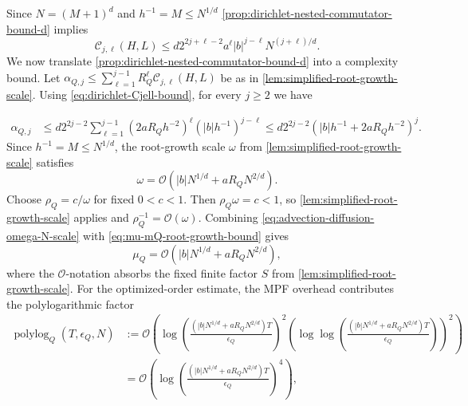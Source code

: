 \documentclass[10pt,reqno]{article}
\numberwithin{equation}{section}
\theoremstyle{plain}
\theoremstyle{definition}
\begin{document}
Since \(N=(M+1)^d\) and \(h^{-1}=M\leq N^{1/d}\) \cref{prop:dirichlet-nested-commutator-bound-d} implies
\begin{equation}\label{eq:dirichlet-Cjell-N-scaling}
\mathcal C_{j,\ell}(H,L) \leq d 2^{2j+\ell-2} a^\ell |b|^{j-\ell} N^{(j+\ell)/d}.
\end{equation}
We now translate \cref{prop:dirichlet-nested-commutator-bound-d} into a complexity bound.  Let \(\alpha_{Q,j} \leq \sum_{\ell=1}^{j-1} R_Q^\ell \mathcal C_{j,\ell}(H,L)\) be as in \cref{lem:simplified-root-growth-scale}. Using \cref{eq:dirichlet-Cjell-bound}, for every \(j \geq 2\) we have

\begin{align}\label{eq:advection-diffusion-alphaQj-bound}
\alpha_{Q,j} &\leq d2^{2j-2} \sum_{\ell=1}^{j-1} (2aR_Qh^{-2} )^\ell (|b|h^{-1} )^{j-\ell} \leq d2^{2j-2} ( |b|h^{-1} + 2aR_Qh^{-2} )^j .
\end{align}
Since \(h^{-1}=M\leq N^{1/d}\), the root-growth scale \(\omega\) from \cref{lem:simplified-root-growth-scale} satisfies
\begin{equation}\label{eq:advection-diffusion-omega-N-scale}
\omega = \mathcal O ( |b|N^{1/d} + aR_QN^{2/d}).
\end{equation}
Choose \(\rho_Q=c/\omega\) for fixed \(0<c<1\). Then \(\rho_Q\omega=c<1\), so \cref{lem:simplified-root-growth-scale} applies and \(\rho_Q^{-1}=\mathcal O(\omega)\). Combining \cref{eq:advection-diffusion-omega-N-scale} with \cref{eq:mu-mQ-root-growth-bound} gives
\begin{equation}\label{eq:advection-diffusion-muQ-scale}
\mu_Q= \mathcal O ( |b|N^{1/d} + aR_QN^{2/d}),
\end{equation}
where the \(\mathcal O\)-notation absorbs the fixed finite factor \(S\) from \cref{lem:simplified-root-growth-scale}. For the optimized-order estimate, the MPF overhead contributes the polylogarithmic factor
\begin{align}\label{eq:advection-diffusion-polylog-factor}
\operatorname{polylog}_Q(T,\epsilon_Q,N) &:= \mathcal O\left( \log\left( \frac{ \left(|b|N^{1/d}+aR_QN^{2/d}\right)T }{\epsilon_Q} \right)^2 \left( \log\log\left( \frac{ \left(|b|N^{1/d}+aR_QN^{2/d}\right)T }{\epsilon_Q} \right) \right)^2 \right) \nonumber\\ &= \mathcal O\left( \log\left( \frac{ \left(|b|N^{1/d}+aR_QN^{2/d}\right)T }{\epsilon_Q} \right)^4 \right),
\end{align}
\end{document}
